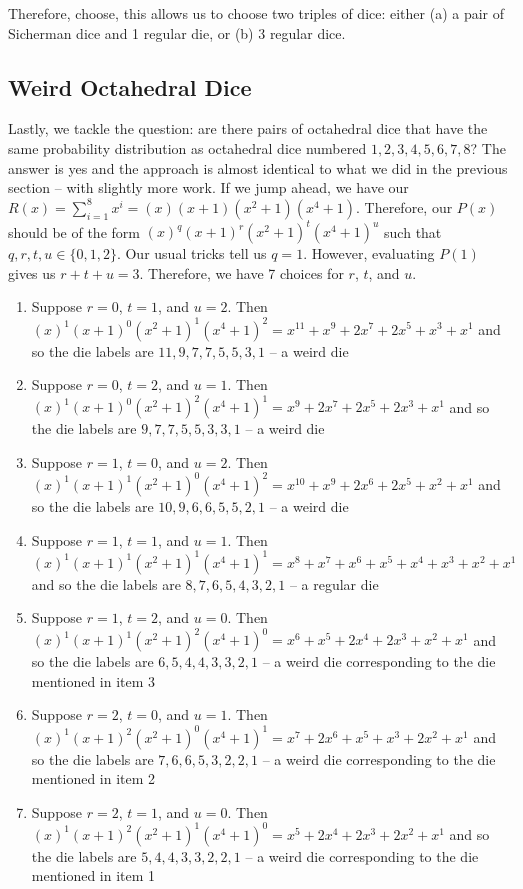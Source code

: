 \documentclass[12pt]{report}
\begin{document}
Therefore, choose, this allows us to choose two triples of dice: either (a) a pair of Sicherman dice and 1 regular die, or (b) 3 regular dice.

\subsection*{Weird Octahedral Dice}
Lastly, we tackle the question: are there pairs of octahedral dice that have the same probability distribution
as octahedral dice numbered $1,2,3,4,5,6,7,8$? The answer is yes and the approach is almost identical to what
we did in the previous section -- with slightly more work. If we jump ahead, we have our
$R(x)=\sum_{i=1}^{8} x^{i}=(x)(x+1)(x^{2}+1)(x^{4}+1)$. Therefore, our $P(x)$ should be of the form
$(x)^{q}(x+1)^{r}(x^{2}+1)^{t}(x^{4}+1)^{u}$ such that $q,r,t,u \in \{0,1,2\}$. Our usual tricks tell us
$q=1$. However, evaluating $P(1)$ gives us $r+t+u=3$. Therefore, we have 7 choices for $r$, $t$, and $u$.

\begin{enumerate}
\item Suppose $r=0$, $t=1$, and $u=2$. Then $(x)^{1}(x+1)^{0}(x^{2}+1)^{1}(x^{4}+1)^{2}=x^{11}+x^{9}+2x^{7}+2x^{5}+x^{3}+x^{1}$ and so the die labels are $11,9,7,7,5,5,3,1$ -- a weird die
\item Suppose $r=0$, $t=2$, and $u=1$. Then $(x)^{1}(x+1)^{0}(x^{2}+1)^{2}(x^{4}+1)^{1}=x^{9}+2x^{7}+2x^{5}+2x^{3}+x^{1}$ and so the die labels are $9,7,7,5,5,3,3,1$ -- a weird die
\item Suppose $r=1$, $t=0$, and $u=2$. Then $(x)^{1}(x+1)^{1}(x^{2}+1)^{0}(x^{4}+1)^{2}=x^{10}+x^{9}+2x^{6}+2x^{5}+x^{2}+x^{1}$ and so the die labels are $10,9,6,6,5,5,2,1$ -- a weird die
\item Suppose $r=1$, $t=1$, and $u=1$. Then $(x)^{1}(x+1)^{1}(x^{2}+1)^{1}(x^{4}+1)^{1}=x^{8}+x^{7}+x^{6}+x^{5}+x^{4}+x^{3}+x^{2}+x^{1}$ and so the die labels are $8,7,6,5,4,3,2,1$ -- a regular die 
\item Suppose $r=1$, $t=2$, and $u=0$. Then $(x)^{1}(x+1)^{1}(x^{2}+1)^{2}(x^{4}+1)^{0}=x^{6}+x^{5}+2x^{4}+2x^{3}+x^{2}+x^{1}$ and so the die labels are $6,5,4,4,3,3,2,1$ -- a weird die corresponding to the die mentioned in item 3
\item Suppose $r=2$, $t=0$, and $u=1$. Then $(x)^{1}(x+1)^{2}(x^{2}+1)^{0}(x^{4}+1)^{1}=x^{7}+2x^{6}+x^{5}+x^{3}+2x^{2}+x^{1}$ and so the die labels are $7,6,6,5,3,2,2,1$ -- a weird die corresponding to the die mentioned in item 2
\item Suppose $r=2$, $t=1$, and $u=0$. Then $(x)^{1}(x+1)^{2}(x^{2}+1)^{1}(x^{4}+1)^{0}=x^{5}+2x^{4}+2x^{3}+2x^{2}+x^{1}$ and so the die labels are $5,4,4,3,3,2,2,1$ -- a weird die corresponding to the die mentioned in item 1
\end{enumerate}
\end{document}
